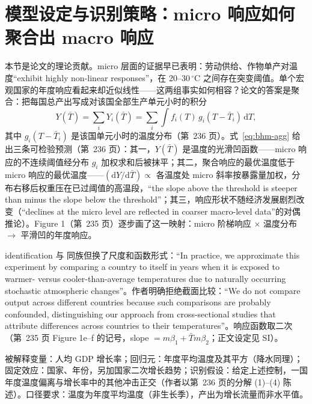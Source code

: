 \section{模型设定与识别策略：micro 响应如何聚合出 macro 响应}

本节是论文的理论贡献。micro 层面的证据早已表明：劳动供给、作物单产对温度``exhibit highly non-linear responses''\citep[第~235 页]{burke2015global}，在 20--30\,$^\circ$C 之间存在突变阈值。单个宏观国家的年度响应看起来却近似线性——这两组事实如何相容？论文的答案是聚合：把每国总产出写成对该国全部生产单元小时的积分
\begin{equation}
Y(\bar{T}) = \sum_i Y_i(\bar{T}) = \sum_i \int f_i(T)\, g_i(T-\bar{T}_i)\,\mathrm{d}T ,
\label{eq:bhm-agg}
\end{equation}
其中 $g_i(T-\bar{T}_i)$ 是该国单元小时的温度分布（第~236 页）。式~\ref{eq:bhm-agg} 给出三条可检验预测（第~236 页）：其一，$Y(\bar T)$ 是温度的光滑凹函数——micro 响应的不连续阈值经分布 $g_i$ 加权求和后被抹平；其二，聚合响应的最优温度低于 micro 响应的最优温度——$(\mathrm{d}Y/\mathrm{d}\bar T)\propto$ 各温度处 micro 斜率按暴露量加权，分布右移后权重压在已过阈值的高温段，``the slope above the threshold is steeper than minus the slope below the threshold''\citep[第~236 页]{burke2015global}；其三，响应形状不随经济发展剧烈改变（``declines at the micro level are reflected in coarser macro-level data''\citep[第~236 页]{burke2015global}的对偶推论）。Figure 1（第~235 页）逐步画了这一映射：micro 阶梯响应 $\times$ 温度分布 $\to$ 平滑凹的年度响应。

identification 与  同族但换了尺度和函数形式：``In practice, we approximate this experiment by comparing a country to itself in years when it is exposed to warmer- versus cooler-than-average temperatures due to naturally occurring stochastic atmospheric changes''\citep[第~236 页]{burke2015global}。作者明确拒绝截面比较：``We do not compare output across different countries because such comparisons are probably confounded, distinguishing our approach from cross-sectional studies that attribute differences across countries to their temperatures''\citep[第~236 页]{burke2015global}。响应函数取二次（第~235 页 Figure 1e--f 的记号，slope $= m\beta_1 + \bar T m\beta_2$；正文设定见 SI）。

\begin{ident}
被解释变量：人均 GDP 增长率；回归元：年度平均温度及其平方（降水同理）；固定效应：国家、年份，另加国家二次增长趋势；识别假设：给定上述控制，一国年度温度偏离与增长率中的其他冲击正交（作者以第~236 页的分解 (1)--(4) 陈述）。口径要求：温度为年度平均温度（非生长季），产出为增长流量而非水平值。
\end{ident}

